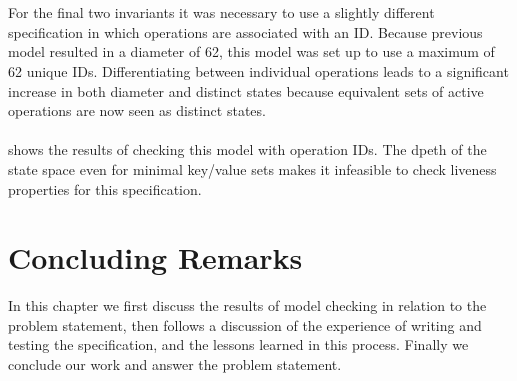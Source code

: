 \documentclass{uit-thesis}
\begin{document}
\\\\
For the final two invariants it was necessary to use a slightly different specification in which operations are associated with an ID. Because previous model resulted in a diameter of 62, this model was set up to use a maximum of 62 unique IDs. Differentiating between individual operations leads to a significant increase in both diameter and distinct states because equivalent sets of active operations are now seen as distinct states.
\\\\
 shows the results of checking this model with operation IDs. The dpeth of the state space even for minimal key/value sets makes it infeasible to check liveness properties for this specification.


\chapter{Concluding Remarks}\label{ch:concluding-remarks}
In this chapter we first discuss the results of model checking in relation to the problem statement, then follows a discussion of the experience of writing and testing the specification, and the lessons learned in this process. Finally we conclude our work and answer the problem statement.
\end{document}
